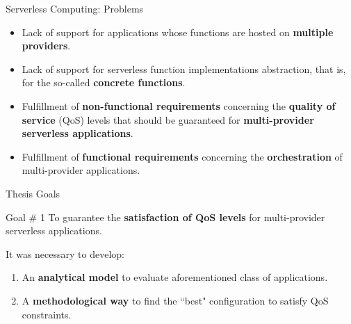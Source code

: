\documentclass[13.5pt]{beamer}
\newcommand{\B}[1]{\textcolor{TorVergataColor}{\textbf{#1}}}
\begin{document}
\begin{frame}{Serverless Computing: Problems}
	
	\begin{itemize}
		\item Lack of support for applications whose functions are hosted on \B{multiple providers}.
		\vspace{\baselineskip}
		\item Lack of support for serverless function implementations abstraction, that is, for the so-called \B{concrete functions}.
		\vspace{\baselineskip}
		\item Fulfillment of \B{non-functional requirements} concerning the \B{quality of service} (QoS) levels that should be guaranteed for \B{multi-provider serverless applications}.
		\vspace{\baselineskip}
		\item Fulfillment of \B{functional requirements} concerning the \B{orchestration} of multi-provider applications.
	\end{itemize}

\end{frame} 

\begin{frame}{Thesis Goals}
	
	\begin{block}{Goal $\#$ 1}
		\centering
	To guarantee the \B{satisfaction of QoS levels} for multi-provider serverless applications. 
	\end{block}

	\vspace{\baselineskip}
	It was necessary to develop:
	\vspace{\baselineskip} 
	
	\begin{enumerate}
		\justifying
	
	\item An \B{analytical model} to evaluate aforementioned class of applications.

	\vspace{\baselineskip} 
	
	\item A \B{methodological way} to find the ``best" configuration to satisfy QoS constraints.
	
	\end{enumerate}
	\end{frame} 

\end{document}
